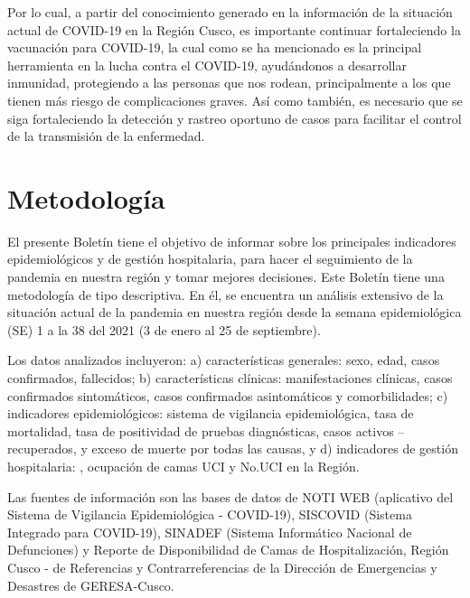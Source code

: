 \documentclass[12pt,a4paper,openany]{book}
\begin{document}
	Por lo cual, a partir del conocimiento generado en la información de la situación actual de COVID-19 en la Región Cusco, es importante continuar fortaleciendo la vacunación para COVID-19, la cual como se ha mencionado es la principal herramienta en la lucha contra el COVID-19, ayudándonos a desarrollar inmunidad, protegiendo a las personas que nos rodean, principalmente a los que tienen más riesgo de complicaciones graves. Así como también, es necesario que se siga fortaleciendo la detección y rastreo oportuno de casos para facilitar el control de la transmisión de la enfermedad.
	
	
	\chapter*{Metodología}
	\noindent El presente Boletín tiene el objetivo de informar sobre los principales indicadores epidemiológicos y de gestión hospitalaria,  para hacer el seguimiento de la pandemia en nuestra región y tomar mejores decisiones. Este Boletín tiene una metodología de tipo descriptiva. En él, se encuentra un análisis extensivo de la situación actual de la pandemia en nuestra región desde la semana epidemiológica (SE) 1 a la 38 del 2021 (3 de enero al 25 de septiembre).
	
	Los datos analizados incluyeron: a) características generales: sexo, edad, casos confirmados, fallecidos; b) características clínicas: manifestaciones clínicas, casos confirmados sintomáticos, casos confirmados asintomáticos y comorbilidades; c) indicadores epidemiológicos: sistema de vigilancia epidemiológica, tasa de mortalidad, tasa de positividad de pruebas diagnósticas, casos activos – recuperados, y exceso de muerte por todas las causas, y d) indicadores de gestión hospitalaria: , ocupación de camas UCI y No.UCI en la Región.
	
	Las fuentes de información son las bases de datos de NOTI WEB (aplicativo del Sistema de Vigilancia Epidemiológica - COVID-19), SISCOVID (Sistema Integrado para COVID-19), SINADEF (Sistema Informático Nacional de Defunciones) y Reporte de Disponibilidad de Camas de Hospitalización, Región Cusco - de Referencias y Contrarreferencias de la Dirección de Emergencias y Desastres de GERESA-Cusco.
	
\end{document}

